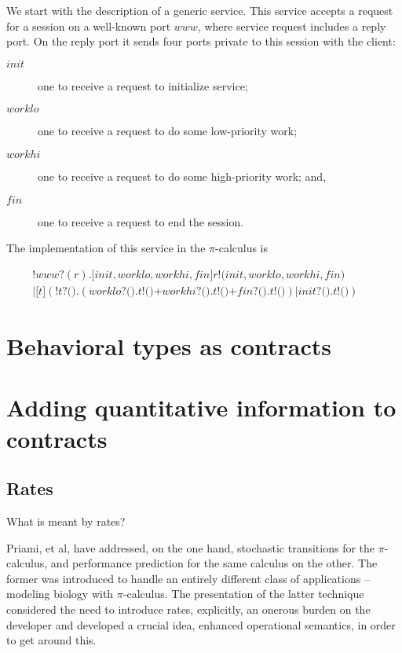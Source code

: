 \documentclass{amsart}
\newcommand{\id}[1]{\texttt{#1}}
\newcommand{\altern}{\mathbin{\id{+}}}
\newcommand{\juxtap}{\mathbin{\id{|}}}
\theoremstyle{definition}
\theoremstyle{remark}
\numberwithin{equation}{subsection}
\begin{document}
We start with the description of a generic service. This service
accepts a request for a session on a well-known port $www$, where service
request includes a reply port. On the reply port it sends four ports
private to this session with the client:

\begin{description}

\item[$init$] one to receive a request to initialize service;

\item[$worklo$] one to receive a request to do some low-priority work; 

\item[$workhi$] one to receive a request to do some high-priority work; and,

\item[$fin$] one to receive a request to end the session.

\end{description}

The implementation of this service in the $\pi$-calculus is

\begin{eqnarray*}
    \id{!}www\id{?}(r) \id{.} \id{[} init,worklo,workhi,fin \id{]} r \id{!}\id{(}init,worklo,workhi,fin\id{)} & & \\
	\juxtap \id{[} t \id{]} ( \id{!}t \id{?} \id{(}\id{)} \id{.} ( worklo \id{?} \id{(}\id{)} \id{.} t \id{!} \id{(}\id{)} \altern workhi \id{?} \id{(}\id{)} \id{.} t \id{!} \id{(}\id{)} \altern fin \id{?} \id{(}\id{)} \id{.} t \id{!} \id{(}\id{)} ) \juxtap init \id{?} \id{(}\id{)} \id{.} t \id{!} \id{(}\id{)})
\end{eqnarray*}

\section{Behavioral types as contracts}

\section{Adding quantitative information to contracts}

\subsection{Rates}

What is meant by rates?

Priami, et al, have addressed, on the one hand, stochastic transitions
for the $\pi$-calculus, and performance prediction for the same
calculus on the other. The former was introduced to handle an entirely
different class of applications -- modeling biology with
$\pi$-calculus. The presentation of the latter technique considered
the need to introduce rates, explicitly, an onerous burden on the
developer and developed a crucial idea, enhanced operational
semantics, in order to get around this.
\end{document}
